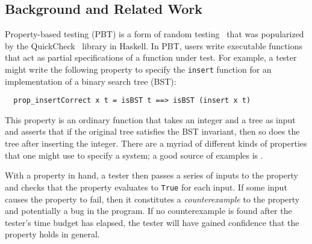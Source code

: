 
\subsection{Background and Related Work }

%
%
Property-based testing (PBT) is a form of random testing~\cite{hamlet1994random}
that was popularized by the QuickCheck~\cite{DBLP:conf/icfp/ClaessenH00} library
in Haskell. In PBT, users write executable functions that act as partial
specifications of a function under test. For example, a tester might write the
following property to specify the \lstinline{insert} function for an
implementation of a binary search tree (BST):
\begin{lstlisting}
  prop_insertCorrect x t = isBST t ==> isBST (insert x t)
\end{lstlisting}
This property is an ordinary function that takes an integer and a tree as input
and asserts that if the original tree satisfies the BST invariant, then so does
the tree after inserting the integer. There are a myriad of different kinds of
properties that one might use to specify a system; a good source of examples is
\citet{HowToSpecifyIt}.

With a property in hand, a tester then passes a series of inputs to the property
and checks that the property evaluates to \lstinline{True} for each input.  If
some input causes the property to fail, then it constitutes a {\em
counterexample} to the property and potentially a bug in the program. If no
counterexample is found after the tester's time budget has elapsed, the tester
will have gained confidence that the property holds in general.

